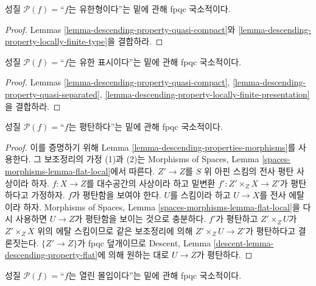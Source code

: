 \begin{lemma}
\label{lemma-descending-property-finite-type}
성질 $\mathcal{P}(f)=$``$f$는 유한형이다''는 밑에 관해 fpqc 국소적이다.
\end{lemma}

\begin{proof}
Lemmas \ref{lemma-descending-property-quasi-compact}와
\ref{lemma-descending-property-locally-finite-type}을 결합하라.
\end{proof}

\begin{lemma}
\label{lemma-descending-property-finite-presentation}
성질 $\mathcal{P}(f)=$``$f$는 유한 표시이다''는 밑에 관해 fpqc
국소적이다.
\end{lemma}

\begin{proof}
Lemmas \ref{lemma-descending-property-quasi-compact},
\ref{lemma-descending-property-quasi-separated},
\ref{lemma-descending-property-locally-finite-presentation}을 결합하라.
\end{proof}

\begin{lemma}
\label{lemma-descending-property-flat}
성질 $\mathcal{P}(f)=$``$f$는 평탄하다''는 밑에 관해 fpqc 국소적이다.
\end{lemma}

\begin{proof}
이를 증명하기 위해 Lemma \ref{lemma-descending-properties-morphisms}를
사용한다. 그 보조정리의 가정 (1)과 (2)는 Morphisms of Spaces, Lemma
\ref{spaces-morphisms-lemma-flat-local}에서 따른다. $Z'\to Z$를 $S$ 위
아핀 스킴의 전사 평탄 사상이라 하자. $f:X\to Z$를 대수공간의 사상이라
하고 밑변환 $f':Z'\times_ZX\to Z'$가 평탄하다고 가정하자. $f$가
평탄함을 보여야 한다. $U$를 스킴이라 하고 $U\to X$를 전사 에탈이라
하자. Morphisms of Spaces, Lemma \ref{spaces-morphisms-lemma-flat-local}을
다시 사용하면 $U\to Z$가 평탄함을 보이는 것으로 충분하다. $f'$가
평탄하고 $Z'\times_ZU$가 $Z'\times_ZX$ 위의 에탈 스킴이므로 같은
보조정리에 의해 $Z'\times_ZU\to Z'$가 평탄하다고 결론짓는다.
$\{Z'\to Z\}$가 fpqc 덮개이므로 Descent, Lemma
\ref{descent-lemma-descending-property-flat}에 의해 원하는 대로
$U\to Z$가 평탄하다.
\end{proof}

\begin{lemma}
\label{lemma-descending-property-open-immersion}
성질 $\mathcal{P}(f)=$``$f$는 열린 몰입이다''는 밑에 관해 fpqc
국소적이다.
\end{lemma}

